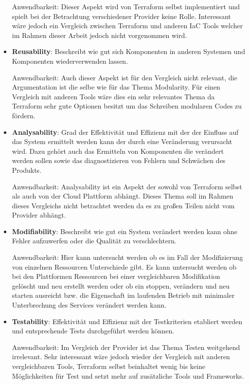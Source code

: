 \begin{spacing}{1.2}
\begin{itemize}
  Anwendbarkeit: Dieser Aspekt wird von Terraform selbst implementiert
  und spielt bei der Betrachtung verschiedener Provider keine Rolle.
  Interessant wäre jedoch ein Vergleich zwischen Terraform und anderen
  IaC Tools welcher im Rahmen dieser Arbeit jedoch nicht vorgenommen wird.

  \item \textbf{Reusability}: Beschreibt wie gut sich Komponenten in
  anderen Systemen und Komponenten wiederverwenden lassen.

  Anwendbarkeit: Auch dieser Aspekt ist für den Vergleich nicht
  relevant, die Argumentation ist die selbe wie für das Thema Modularity.
  Für einen Vergleich mit anderen Tools wäre dies ein sehr relevantes
  Thema da Terraform sehr gute Optionen besitzt um das Schreiben
  modularen Codes zu fördern. 

  \item \textbf{Analysability}: Grad der Effektivität und Effizienz mit
  der der Einfluss auf das System ermittelt werden kann der durch eine
  Veränderung verursacht wird. Dazu gehört auch das Ermitteln von 
  Komponenten die verändert werden sollen sowie das diagnostizieren von
  Fehlern und Schwächen des Produkts.
  
  Anwendbarkeit: Analysability ist ein Aspekt der sowohl
  von Terraform selbst als auch von der Cloud Plattform abhängt. Dieses
  Thema soll im Rahmen dieses Vergleichs nicht betrachtet werden da
  es zu großen Teilen nicht vom Provider abhängt.
  
  \item \textbf{Modifiability}: Beschreibt wie gut ein System verändert
  werden kann ohne Fehler aufzuwerfen oder die Qualität zu verschlechtern.

  Anwendbarkeit: Hier kann untersucht werden ob es im Fall der
  Modifizierung von einzelnen Ressourcen Unterschiede gibt. Es kann
  untersucht werden ob bei den Plattformen Ressourcen bei einer
  vergleichbaren Modifikation gelöscht und neu erstellt werden oder
  ob ein stoppen, verändern und neu starten ausreicht bzw. die
  Eigenschaft im laufenden Betrieb mit minimaler Unterbrechung des
  Services verändert werden kann. 
  
  \item \textbf{Testability}: Effektivität und Effizienz mit der
  Testkriterien etabliert werden und entsprechende Tests durchgeführt
  werden können.

  Anwendbarkeit: Im Vergleich der Provider ist das Thema Testen
  weitgehend irrelevant. Sehr interessant wäre jedoch wieder der Vergleich
  mit anderen vergleichbaren Tools, Terraform selbst beinhaltet
  wenig bis keine Möglichkeiten für Test und setzt mehr auf zusätzliche
  Tools und Frameworks.
\end{itemize}


\end{spacing}
